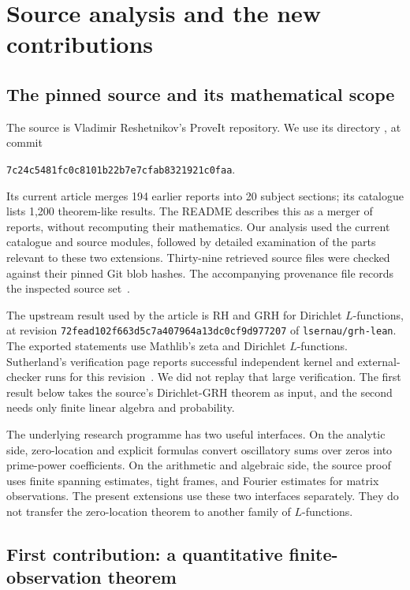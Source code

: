 \section{Source analysis and the new contributions}

\subsection{The pinned source and its mathematical scope}

The source is Vladimir Reshetnikov's ProveIt repository. We use its directory
, at commit
\begin{center}
\small\texttt{7c24c5481fc0c8101b22b7e7cfab8321921c0faa}.
\end{center}
Its current article merges 194 earlier reports into 20 subject sections; its catalogue lists 1,200 theorem-like results. The README describes this as a merger of reports, without recomputing their mathematics. Our analysis used the current catalogue and source modules, followed by detailed examination of the parts relevant to these two extensions. Thirty-nine retrieved source files were checked against their pinned Git blob hashes. The accompanying provenance file records the inspected source set~\cite{ProveIt2026}.

The upstream result used by the article is RH and GRH for Dirichlet $L$-functions, at revision \texttt{72fead102f663d5c7a407964a13dc0cf9d977207} of \texttt{lsernau/grh-lean}. The exported statements use Mathlib's zeta and Dirichlet $L$-functions. Sutherland's verification page reports successful independent kernel and external-checker runs for this revision~\cite{Sutherland2026}. We did not replay that large verification. The first result below takes the source's Dirichlet-GRH theorem as input, and the second needs only finite linear algebra and probability.

The underlying research programme has two useful interfaces. On the analytic side, zero-location and explicit formulas convert oscillatory sums over zeros into prime-power coefficients. On the arithmetic and algebraic side, the source proof uses finite spanning estimates, tight frames, and Fourier estimates for matrix observations. The present extensions use these two interfaces separately. They do not transfer the zero-location theorem to another family of $L$-functions.

\subsection{First contribution: a quantitative finite-observation theorem}

